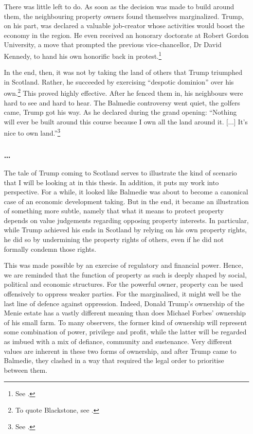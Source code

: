 There was little left to do. As soon as the decision was made to build around them, the neighbouring property owners found themselves marginalized. Trump, on his part, was declared a valuable job-creator whose activities would boost the economy in the region. He even received an honorary doctorate at Robert Gordon University, a move that prompted the previous vice-chancellor, Dr David Kennedy, to hand his own honorific back in protest.\footnote{See \cite{bbc10b}.}

In the end, then, it was not by taking the land of others that Trump triumphed in Scotland. Rather, he succeeded by exercising ``despotic dominion'' over his own.\footnote{To quote Blackstone, see \cite[2]{blackstone79b}.} This proved highly effective. After he fenced them in, his neighbours were hard to see and hard to hear. The Balmedie controversy went quiet, the golfers came, Trump got his way. As he declared during the grand opening: ``Nothing will ever be built around this course because I own all the land around it. [...] It's nice to own land.''\footnote{See \cite{booth12}.}

\subsubsection*{\ldots}

The tale of Trump coming to Scotland serves to illustrate the kind of scenario that I will be looking at in this thesis. In addition, it puts my work into perspective. For a while, it looked like Balmedie was about to become a canonical case of an economic development taking. But in the end, it became an illustration of something more subtle, namely that what it means to protect property depends on value judgements regarding opposing property interests. In particular, while Trump achieved his ends in Scotland by relying on his own property rights, he did so by undermining the property rights of others, even if he did not formally condemn those rights.

This was made possible by an exercise of regulatory and financial power. Hence, we are reminded that the function of property as such is deeply shaped by social, political and economic structures. For the powerful owner, property can be used offensively to oppress weaker parties. For the marginalised, it might well be the last line of defence against oppression. Indeed, Donald Trump's ownership of the Menie estate has a vastly different meaning than does Michael Forbes' ownership of his small farm. To many observers, the former kind of ownership will represent some combination of power, privilege and profit, while the latter will be regarded as imbued with a mix of defiance, community and sustenance. Very different values are inherent in these two forms of ownership, and after Trump came to Balmedie, they clashed in a way that required the legal order to prioritise between them.

